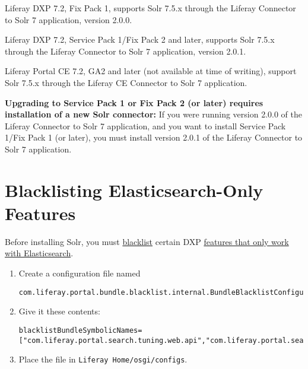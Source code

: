 Liferay DXP 7.2, Fix Pack 1, supports Solr 7.5.x through the Liferay
Connector to Solr 7 application, version 2.0.0.

Liferay DXP 7.2, Service Pack 1/Fix Pack 2 and later, supports Solr
7.5.x through the Liferay Connector to Solr 7 application, version
2.0.1.

Liferay Portal CE 7.2, GA2 and later (not available at time of writing),
support Solr 7.5.x through the Liferay CE Connector to Solr 7
application.

\noindent\hrulefill

\textbf{Upgrading to Service Pack 1 or Fix Pack 2 (or later) requires
installation of a new Solr connector:} If you were running version 2.0.0
of the Liferay Connector to Solr 7 application, and you want to install
Service Pack 1/Fix Pack 1 (or later), you must install version 2.0.1 of
the Liferay Connector to Solr 7 application.

\noindent\hrulefill

\section{Blacklisting Elasticsearch-Only
Features}\label{blacklisting-elasticsearch-only-features}

Before installing Solr, you must
\href{/docs/7-2/user/-/knowledge_base/u/blacklisting-osgi-bundles-and-components}{blacklist}
certain DXP
\href{/docs/7-2/deploy/-/knowledge_base/d/installing-a-search-engine\#choosing-a-search-engine}{features
that only work with Elasticsearch}.

\begin{enumerate}
\def\labelenumi{\arabic{enumi}.}
\item
  Create a configuration file named

\begin{verbatim}
com.liferay.portal.bundle.blacklist.internal.BundleBlacklistConfiguration.config
\end{verbatim}
\item
  Give it these contents:

\begin{verbatim}
blacklistBundleSymbolicNames=["com.liferay.portal.search.tuning.web.api","com.liferay.portal.search.tuning.web","com.liferay.portal.search.tuning.synonyms.web","com.liferay.portal.search.tuning.rankings.web"]
\end{verbatim}
\item
  Place the file in \texttt{Liferay\ Home/osgi/configs}.
\end{enumerate}

